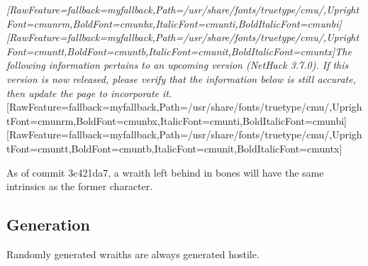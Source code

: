 {\itshape \allowbreak{}\setmainfont{cmunti.ttf}[RawFeature={fallback=myfallback},Path=/usr/share/fonts/truetype/cmu/,UprightFont=cmunrm,BoldFont=cmunbx,ItalicFont=cmunti,BoldItalicFont=cmunbi]\setmonofont{cmunti.ttf}[RawFeature={fallback=myfallback},Path=/usr/share/fonts/truetype/cmu/,UprightFont=cmuntt,BoldFont=cmuntb,ItalicFont=cmunit,BoldItalicFont=cmuntx]\itshape The following information pertains to an upcoming version (NetHack 3.7.0\footnotemark[19]). If this version is now released, please verify that the information below is still accurate, then update the page to incorporate it.}\allowbreak{}\setmainfont{cmunrm.ttf}[RawFeature={fallback=myfallback},Path=/usr/share/fonts/truetype/cmu/,UprightFont=cmunrm,BoldFont=cmunbx,ItalicFont=cmunti,BoldItalicFont=cmunbi]\setmonofont{cmunrm.ttf}[RawFeature={fallback=myfallback},Path=/usr/share/fonts/truetype/cmu/,UprightFont=cmuntt,BoldFont=cmuntb,ItalicFont=cmunit,BoldItalicFont=cmuntx]



As of commit 3c421da7\footnotemark[20], a wraith left behind in bones will have the same intrinsics as the former character.
\subsection{Generation}
\label{2}
Randomly generated wraiths are always generated hostile.


